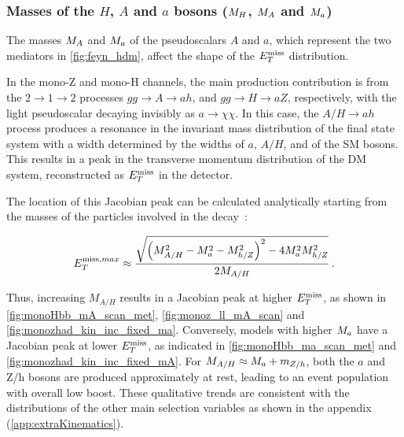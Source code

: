 
\subsubsection{Masses of the $H$, $A$ and $a$  bosons ($M_{H}$, $M_{A}$ and $M_{a}$)}

The masses $M_{A}$ and $M_{a}$ of the pseudoscalars $A$ and $a$, which represent the two mediators in \autoref{fig:feyn_hdm}, affect the shape of the $E_T^\mathrm{miss}$ distribution.  

In the mono-Z and mono-H channels, the main production contribution is from the $2\to1\to2$ processes $gg\to A\to a h$, and $gg\to H\to a Z$, respectively, with the light pseudoscalar decaying invisibly as $a\to \chi\chi$. In this case, the $A/H \to a h $ process produces a resonance in the invariant mass distribution of the final state system with a width determined by the widths of $a$, $A/H$, and of the SM bosons. This results in a peak in the transverse momentum distribution of the DM system, reconstructed as $E_T^\mathrm{miss}$ in the detector.

The location of this Jacobian peak can be calculated analytically starting from the masses of the particles involved in the decay~\cite{Bauer:2017ota}:

\newcommand{\mAH}{\ensuremath{M_{A/H}}\xspace}
\begin{align}
E^{\mathrm{miss},max}_T \approx \frac{\sqrt{\left(\mAH^2 -\ma^2 -M_{h/Z}^2\right)^2 - 4 \ma^2 M_{h/Z}^2}}{2\mAH}\,.
\label{eq:monoH_peak_met}
\end{align}

Thus, increasing $\mAH$ results in  a Jacobian peak at higher $E_T^\mathrm{miss}$, as shown in \autoref{fig:monoHbb_mA_scan_met}, \autoref{fig:monoz_ll_mA_scan} and \autoref{fig:monozhad_kin_inc_fixed_ma}.
Conversely, models with higher $M_{a}$ have a Jacobian peak at lower $E_T^\mathrm{miss}$, as indicated in \autoref{fig:monoHbb_ma_scan_met} and \autoref{fig:monozhad_kin_inc_fixed_mA}. 
For $\mAH\approx\ma+m_{Z/h}$, both the $a$ and Z/h bosons are produced approximately at rest, leading to an event population with overall low boost. 
These qualitative trends are consistent with the distributions of the other main selection variables as shown in the appendix (\autoref{app:extraKinematics}).

